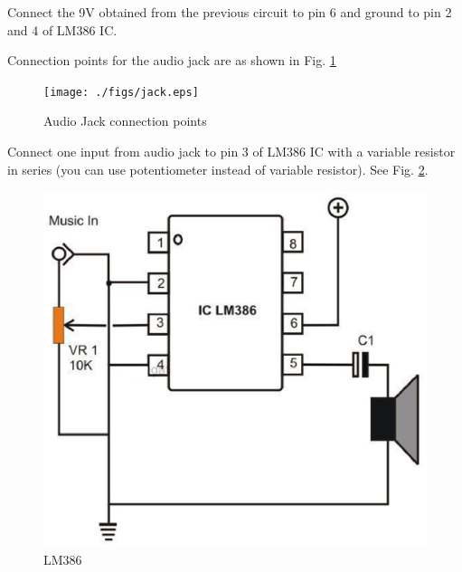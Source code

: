 \documentclass[journal,12pt,twocolumn]{IEEEtran}
\begin{document}
\begin{problem}
Connect the 9V obtained from the previous circuit to pin 6  and ground to pin 2 and 4 of LM386 IC.
\end{problem}
\begin{problem}
Connection points for the audio jack are as shown in Fig. \ref{fig5}
\end{problem}
\begin{figure}[!ht]
\centering
	\texttt{[image: ./figs/jack.eps]}
	\caption{Audio Jack connection points}  \label{fig5}
    \end{figure}
\begin{problem}
Connect one input from audio jack to pin 3 of LM386 IC with a variable resistor in series (you can 
use potentiometer instead of variable resistor). See Fig. \ref{fig6}. 
\end{problem}
\begin{figure}[!ht]
\centering
	\includegraphics[width=\columnwidth]{./figs/LM386.eps}
	\caption{LM386}  \label{fig6}
    \end{figure}
\end{document}
